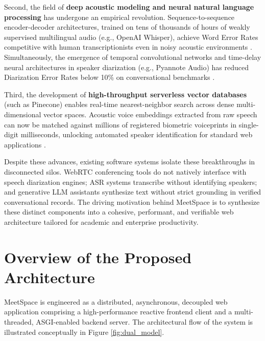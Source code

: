 \documentclass[12pt,oneside,letterpaper]{report}
\numberwithin{equation}{chapter} %
\begin{document}
Second, the field of \textbf{deep acoustic modeling and neural natural language processing} has undergone an empirical revolution. Sequence-to-sequence encoder-decoder architectures, trained on tens of thousands of hours of weakly supervised multilingual audio (e.g., OpenAI Whisper), achieve Word Error Rates competitive with human transcriptionists even in noisy acoustic environments \cite{radford2023robust}. Simultaneously, the emergence of temporal convolutional networks and time-delay neural architectures in speaker diarization (e.g., Pyannote Audio) has reduced Diarization Error Rates below 10\% on conversational benchmarks \cite{bredin2020pyannote}.

Third, the development of \textbf{high-throughput serverless vector databases} (such as Pinecone) enables real-time nearest-neighbor search across dense multi-dimensional vector spaces. Acoustic voice embeddings extracted from raw speech can now be matched against millions of registered biometric voiceprints in single-digit milliseconds, unlocking automated speaker identification for standard web applications \cite{wang2023vector}.

Despite these advances, existing software systems isolate these breakthroughs in disconnected silos. WebRTC conferencing tools do not natively interface with speech diarization engines; ASR systems transcribe without identifying speakers; and generative LLM assistants synthesize text without strict grounding in verified conversational records. The driving motivation behind MeetSpace is to synthesize these distinct components into a cohesive, performant, and verifiable web architecture tailored for academic and enterprise productivity.

\section{Overview of the Proposed Architecture}
MeetSpace is engineered as a distributed, asynchronous, decoupled web application comprising a high-performance reactive frontend client and a multi-threaded, ASGI-enabled backend server. The architectural flow of the system is illustrated conceptually in Figure \ref{fig:dual_model}.
\end{document}
